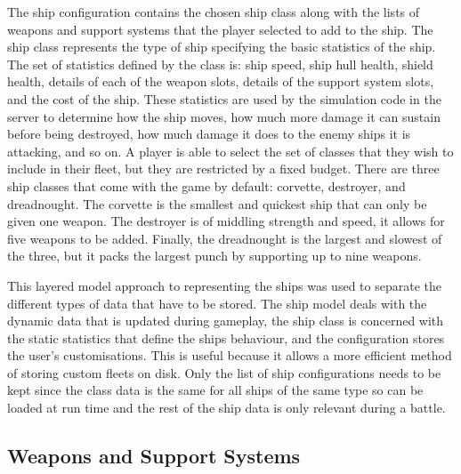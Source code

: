 The ship configuration contains the chosen ship class along with the lists of weapons and support systems that the player selected to add to the ship. The ship class represents the type of ship specifying the basic statistics of the ship. The set of statistics defined by the class is: ship speed, ship hull health, shield health, details of each of the weapon slots, details of the support system slots, and the cost of the ship. These statistics are used by the simulation code in the server to determine how the ship moves, how much more damage it can sustain before being destroyed, how much damage it does to the enemy ships it is attacking, and so on. A player is able to select the set of classes that they wish to include in their fleet, but they are restricted by a fixed budget. There are three ship classes that come with the game by default: corvette, destroyer, and dreadnought. The corvette is the smallest and quickest ship that can only be given one weapon. The destroyer is of middling strength and speed, it allows for five weapons to be added. Finally, the dreadnought is the largest and slowest of the three, but it packs the largest punch by supporting up to nine weapons.

This layered model approach to representing the ships was used to separate the different types of data that have to be stored. The ship model deals with the dynamic data that is updated during gameplay, the ship class is concerned with the static statistics that define the ships behaviour, and the configuration stores the user's customisations. This is useful because it allows a more efficient method of storing custom fleets on disk. Only the list of ship configurations needs to be kept since the class data is the same for all ships of the same type so can be loaded at run time and the rest of the ship data is only relevant during a battle.


\subsection{Weapons and Support Systems}

